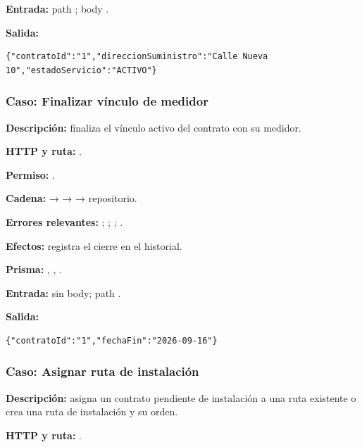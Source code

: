 \textbf{Entrada:} path \texttt{}; body \texttt{}.  

\textbf{Salida:}


\begin{lstlisting}
{"contratoId":"1","direccionSuministro":"Calle Nueva 10","estadoServicio":"ACTIVO"}
\end{lstlisting}


\subsubsection{Caso: Finalizar vínculo de medidor}


\textbf{Descripción:} finaliza el vínculo activo del contrato con su medidor.  

\textbf{HTTP y ruta:} \texttt{}.  

\textbf{Permiso:} \texttt{}.  

\textbf{Cadena:} \texttt{} → \texttt{} → \texttt{} → repositorio.  

\textbf{Errores relevantes:} \texttt{}; \texttt{}; \texttt{}; \texttt{}.  

\textbf{Efectos:} registra el cierre en el historial.  

\textbf{Prisma:} \texttt{}, \texttt{}, \texttt{}.  

\textbf{Entrada:} sin body; path \texttt{}.  

\textbf{Salida:}


\begin{lstlisting}
{"contratoId":"1","fechaFin":"2026-09-16"}
\end{lstlisting}


\subsubsection{Caso: Asignar ruta de instalación}


\textbf{Descripción:} asigna un contrato pendiente de instalación a una ruta existente o crea una ruta de instalación y su orden.  

\textbf{HTTP y ruta:} \texttt{}.  

